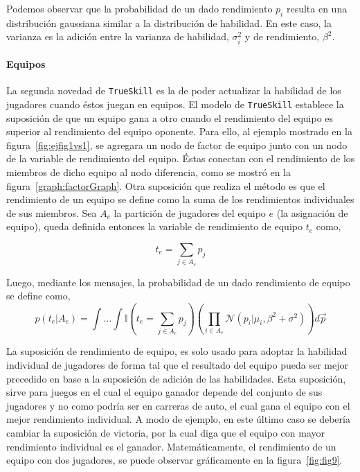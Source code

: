 \documentclass[11pt,twoside,spanish]{report} %
\begin{document}
Podemos observar que la probabilidad de un dado rendimiento $p_i$ resulta en una distribuci\'on gaussiana similar a la distribuci\'on de habilidad.
En este caso, la varianza es la adici\'on entre la varianza de habilidad, $\sigma_i^2$ y de rendimiento, $\beta^2$.

\paragraph{Equipos}

La segunda novedad de \texttt{TrueSkill} es la de poder actualizar la habilidad de los jugadores cuando \'estos juegan en equipos.
El modelo de \texttt{TrueSkill} establece la suposici\'on de que un equipo gana a otro cuando el rendimiento del equipo es superior al rendimiento del equipo oponente.
Para ello, al ejemplo mostrado en la figura~\ref{fig:ejfig1vs1}, se agregara un nodo de factor de equipo junto con un nodo de la variable de rendimiento del equipo.
\'Estas conectan con el rendimiento de los miembros de dicho equipo al nodo diferencia, como se mostr\'o en la figura~\ref{graph:factorGraph}.
Otra suposici\'on que realiza el m\'etodo es que el rendimiento de un equipo se define como la suma de los rendimientos individuales de sus miembros.
Sea $A_e$ la partici\'on de jugadores del equipo $e$ (la asignaci\'on de equipo), queda definida entonces la variable de rendimiento de equipo $t_e$ como,

\begin{equation}
t_e = \sum_{j\in A_e } p_j
\end{equation}

Luego, mediante los mensajes, la probabilidad de un dado rendimiento de equipo se define como,
\begin{equation}
p(t_e|A_e) = \int \dots \int \mathbb{I}(t_e = \sum_{j\in A_e } p_j ) \left(\prod_{i \in A_e} \mathcal{N}(p_i|\mu_i,\beta^2 + \sigma^2) \right) d\vec{p}
\end{equation}

La suposici\'on de rendimiento de equipo, es solo usado para adoptar la habilidad individual de jugadores de forma tal que el resultado del equipo pueda ser mejor precedido en base a la suposici\'on de adici\'on de las habilidades.
Esta suposici\'on, sirve para juegos en el cual el equipo ganador depende del conjunto de sus jugadores y no como podr\'ia ser en carreras de auto, el cual gana el equipo con el mejor rendimiento individual.
A modo de ejemplo, en este \'ultimo caso se deber\'ia cambiar la suposici\'on de victoria, por la cual diga que el equipo con mayor rendimiento individual es el ganador.
Matem\'aticamente, el rendimiento de un equipo con dos jugadores, se puede observar gr\'aficamente en la figura~\ref{fig:fig9}.
\end{document}
